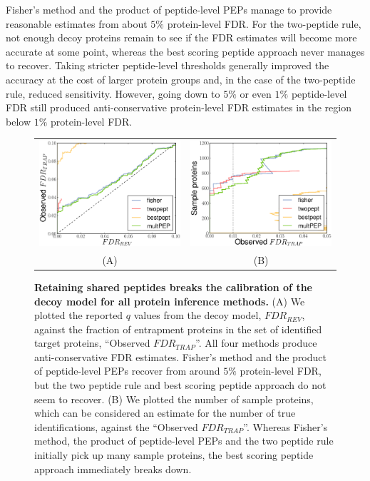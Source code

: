 \documentclass{article}
\begin{document}
Fisher's method and the product of peptide-level PEPs manage to
provide reasonable estimates from about $5\%$ protein-level FDR. For
the two-peptide rule, not enough decoy proteins remain to see if the
FDR estimates will become more accurate at some point, whereas the
best scoring peptide approach never manages to recover. Taking
stricter peptide-level thresholds generally improved the accuracy at
the cost of larger protein groups and, in the case of the two-peptide
rule, reduced sensitivity. However, going down to $5\%$ or even $1\%$
peptide-level FDR still produced anti-conservative protein-level FDR
estimates in the region below $1\%$ protein-level FDR.

\begin{figure}[!htp]
\begin{center}
\begin{tabular}{cc} 
\includegraphics[width=0.45\linewidth]{./img/shared-pept-accuracy} &
\includegraphics[width=0.45\linewidth]{./img/shared-pept-performance}
\\
(A) & (B)
\end{tabular}

\caption{\label{fig:shared-accuracy}\textbf{Retaining shared peptides
breaks the calibration of the decoy model for all protein inference
methods.} (A) We plotted the reported $q$ values from the decoy model,
$FDR_{REV}$, against the fraction of entrapment proteins in the set of
identified target proteins, ``Observed $FDR_{TRAP}$''. All four
methods produce anti-conservative FDR estimates. Fisher's method and
the product of peptide-level PEPs recover from around $5\%$
protein-level FDR, but the two peptide rule and best scoring peptide
approach do not seem to recover. (B) We plotted the number of sample
proteins, which can be considered an estimate for the number of true
identifications, against the ``Observed $FDR_{TRAP}$''. Whereas
Fisher's method, the product of peptide-level PEPs and the two peptide
rule initially pick up many sample proteins, the best scoring peptide
approach immediately breaks down.}
\end{center} 
\end{figure}
\end{document}
